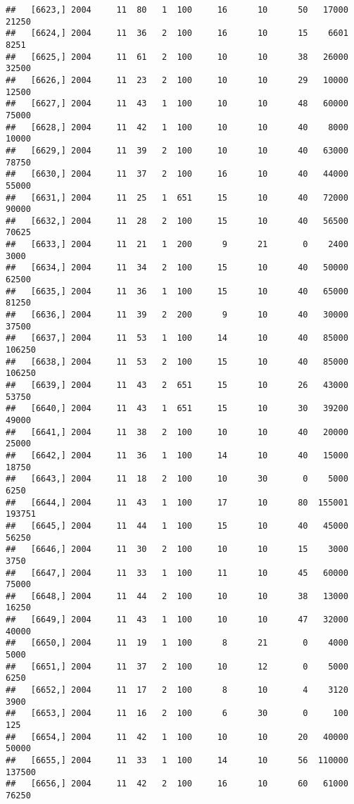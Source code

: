 \documentclass{article}\usepackage[]{graphicx}\usepackage[]{color}
\makeatletter
\newenvironment{kframe}{%
 \def\at@end@of@kframe{}%
 \ifinner\ifhmode%
  \def\at@end@of@kframe{\end{minipage}}%
  \begin{minipage}{\columnwidth}%
 \fi\fi%
 \def\FrameCommand##1{\hskip\@totalleftmargin \hskip-\fboxsep
 \colorbox{shadecolor}{##1}\hskip-\fboxsep
     \hskip-\linewidth \hskip-\@totalleftmargin \hskip\columnwidth}%
 \MakeFramed {\advance\hsize-\width
   \@totalleftmargin\z@ \linewidth\hsize
   \@setminipage}}%
 {\par\unskip\endMakeFramed%
 \at@end@of@kframe}
\newenvironment{knitrout}{}{} %
\makeatother
\begin{document}
\begin{knitrout}
\begin{kframe}
\begin{verbatim}
##   [6623,] 2004     11  80   1  100     16      10      50   17000   21250
##   [6624,] 2004     11  36   2  100     16      10      15    6601    8251
##   [6625,] 2004     11  61   2  100     10      10      38   26000   32500
##   [6626,] 2004     11  23   2  100     10      10      29   10000   12500
##   [6627,] 2004     11  43   1  100     10      10      48   60000   75000
##   [6628,] 2004     11  42   1  100     10      10      40    8000   10000
##   [6629,] 2004     11  39   2  100     10      10      40   63000   78750
##   [6630,] 2004     11  37   2  100     16      10      40   44000   55000
##   [6631,] 2004     11  25   1  651     15      10      40   72000   90000
##   [6632,] 2004     11  28   2  100     15      10      40   56500   70625
##   [6633,] 2004     11  21   1  200      9      21       0    2400    3000
##   [6634,] 2004     11  34   2  100     15      10      40   50000   62500
##   [6635,] 2004     11  36   1  100     15      10      40   65000   81250
##   [6636,] 2004     11  39   2  200      9      10      40   30000   37500
##   [6637,] 2004     11  53   1  100     14      10      40   85000  106250
##   [6638,] 2004     11  53   2  100     15      10      40   85000  106250
##   [6639,] 2004     11  43   2  651     15      10      26   43000   53750
##   [6640,] 2004     11  43   1  651     15      10      30   39200   49000
##   [6641,] 2004     11  38   2  100     10      10      40   20000   25000
##   [6642,] 2004     11  36   1  100     14      10      40   15000   18750
##   [6643,] 2004     11  18   2  100     10      30       0    5000    6250
##   [6644,] 2004     11  43   1  100     17      10      80  155001  193751
##   [6645,] 2004     11  44   1  100     15      10      40   45000   56250
##   [6646,] 2004     11  30   2  100     10      10      15    3000    3750
##   [6647,] 2004     11  33   1  100     11      10      45   60000   75000
##   [6648,] 2004     11  44   2  100     10      10      38   13000   16250
##   [6649,] 2004     11  43   1  100     10      10      47   32000   40000
##   [6650,] 2004     11  19   1  100      8      21       0    4000    5000
##   [6651,] 2004     11  37   2  100     10      12       0    5000    6250
##   [6652,] 2004     11  17   2  100      8      10       4    3120    3900
##   [6653,] 2004     11  16   2  100      6      30       0     100     125
##   [6654,] 2004     11  42   1  100     10      10      20   40000   50000
##   [6655,] 2004     11  33   1  100     14      10      56  110000  137500
##   [6656,] 2004     11  42   2  100     16      10      60   61000   76250

\end{verbatim}
\end{kframe}
\end{knitrout}
\end{document}

